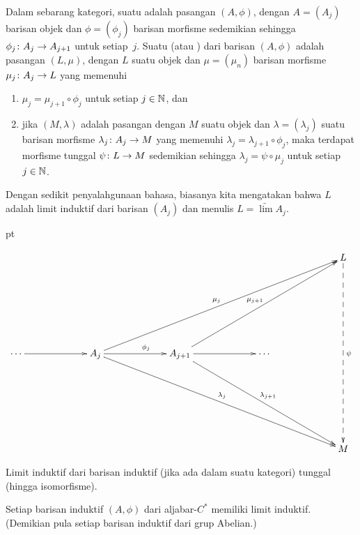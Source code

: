 \begin{defn} Dalam sebarang kategori, suatu
 adalah pasangan $(A,\phi)$, dengan $A = (A_j)$ barisan objek dan
$\phi = (\phi_j)$ barisan morfisme sedemikian sehingga $\phi_j\colon A_j \rightarrow A_{j+1}$ untuk
setiap~$j$. Suatu
 (atau
) dari barisan $(A,\phi)$ adalah pasangan $(L,\mu)$, dengan $L$ suatu objek dan
$\mu = (\mu_n)$ barisan morfisme $\mu_j\colon A_j \rightarrow L$ yang memenuhi
 \begin{enumerate}
  \item[(i)] $\mu_j = \mu_{j+1} \circ \phi_j$ untuk setiap $j \in \mathbb{N}$, dan
  \item[(ii)] jika $(M,\lambda)$ adalah pasangan dengan $M$ suatu objek dan $\lambda = (\lambda_j)$
suatu barisan morfisme $\lambda_j\colon A_j \rightarrow M$ yang memenuhi $\lambda_j = \lambda_{j+1}
\circ \phi_j$, maka terdapat morfisme tunggal $\psi\colon L \rightarrow M$ sedemikian sehingga $\lambda_j
= \psi \circ \mu_j$ untuk setiap $j \in \mathbb{N}$.
 \end{enumerate}
Dengan sedikit penyalahgunaan bahasa, biasanya kita mengatakan bahwa $L$ adalah limit induktif dari barisan $(A_j)$ dan
menulis $L = \underrightarrow{\lim} A_j$.

 pt

   \[\xymatrix@+15pt@C+25pt{&&&& L\ar@{-->}[dddd]^\psi \\
                   &&&&   \\
                  {\cdots}\ar[r] & A_j \ar[uurrr]^{\mu_j}\ar[ddrrr]^{\lambda_j}\ar[r]^(.6){\phi_j} &
                       A_{j+1}\ar[uurr]^{\mu_{j+1}}\ar[ddrr]^{\lambda_{j+1}}\ar[r] & {\cdots} &  \\
                   &&&&   \\
                   &&&& M
    }\]
\end{defn}

\begin{prop} Limit induktif dari barisan induktif (jika ada dalam suatu kategori) tunggal (hingga isomorfisme).
\end{prop}

\begin{prop} Setiap barisan induktif $(A,\phi)$ dari aljabar-$C^*$
memiliki limit induktif. (Demikian pula setiap barisan induktif dari grup Abelian.)
\end{prop}

